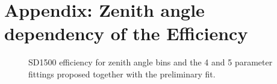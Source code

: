 \documentclass[12pt,a4paper]{article}
\begin{document}
\section*{Appendix: Zenith angle dependency of the Efficiency}

\begin{figure}[H]
    \center
    \caption{SD1500 efficiency for zenith angle bins and the 4 and 5 parameter fittings proposed together with the preliminary fit.
    \label{fig:zenith}}
\end{figure}
\end{document}
